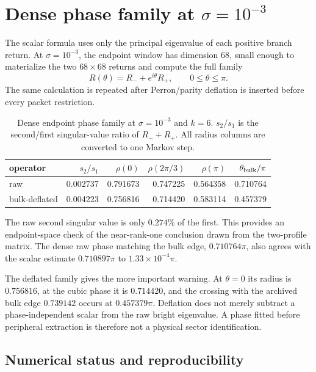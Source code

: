 \documentclass[11pt]{article}
\theoremstyle{definition}
\theoremstyle{remark}
\begin{document}
\section{Dense phase family at \texorpdfstring{$\sigma=10^{-3}$}{sigma=0.001}}
\label{sec:dense-phase}

The scalar formula uses only the principal eigenvalue of each positive
branch return.  At $\sigma=10^{-3}$, the endpoint window has dimension $68$,
small enough to materialize the two $68\times68$ returns and compute the
full family
\begin{equation}\label{eq:dense-family}
 R(\theta)=R_-+e^{i\theta}R_+,
 \qquad0\le\theta\le\pi.
\end{equation}
The same calculation is repeated after Perron/parity deflation is inserted
before every packet restriction.

\begin{table}[H]
\centering
\small
\caption{Dense endpoint phase family at $\sigma=10^{-3}$ and $k=6$.
$s_2/s_1$ is the second/first singular-value ratio of $R_-+R_+$.
All radius columns are converted to one Markov step.}
\label{tab:dense-family}
\begin{tabular}{lrrrrr}
\toprule
operator & $s_2/s_1$ & $\rho(0)$ & $\rho(2\pi/3)$ & $\rho(\pi)$
& $\theta_{\rm bulk}/\pi$\\
\midrule
raw &0.002737&0.791673&0.747225&0.564358&0.710764\\
bulk-deflated&0.004223&0.756816&0.714420&0.583114&0.457379\\
\bottomrule
\end{tabular}
\end{table}

The raw second singular value is only $0.274\%$ of the first.  This provides
an endpoint-space check of the near-rank-one conclusion drawn from the
two-profile matrix.  The dense raw phase matching the bulk edge,
$0.710764\pi$, also agrees with the scalar estimate $0.710897\pi$ to
$1.33\times10^{-4}\pi$.

The deflated family gives the more important warning.  At $\theta=0$ its
radius is $0.756816$, at the cubic phase it is $0.714420$, and the crossing
with the archived bulk edge $0.739142$ occurs at $0.457379\pi$.  Deflation
does not merely subtract a phase-independent scalar from the raw bright
eigenvalue.  A phase fitted before peripheral extraction is therefore not a
physical sector identification.

\subsection{Numerical status and reproducibility}
\end{document}
